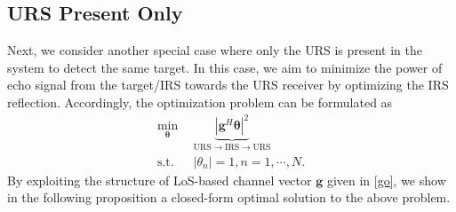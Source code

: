 \documentclass[10pt,final,doublecolumn]{IEEEtran}
\begin{document}
\subsection{URS Present Only }
Next, we consider another special case where only the URS is present in the system to detect the same target. In this case, we aim to minimize the power of echo signal from the target/IRS towards the URS receiver by optimizing the IRS reflection. Accordingly, the optimization problem can be formulated as
\begin{align}\label{uro}
\mathop{\min}\limits_{\boldsymbol{\theta}}~&~
\underbrace{|{\mathbf{g}}^H
\boldsymbol{\theta}|^2}_{\text{URS}\rightarrow \text{IRS}\rightarrow \text{URS}}
\nonumber\\
\text {s.t.}~&~|{\theta}_n|= 1, n=1,\cdots,N.
\end{align}
By exploiting the structure of LoS-based channel vector $\mathbf{g}$ given in \eqref{go}, we show in the following proposition a closed-form optimal solution to the above problem.
\end{document}
